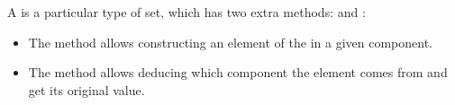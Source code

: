 
A \SetDisjointUnion is a particular type of set, which has two extra methods:  and :
\begin{itemize}
    \item The method  allows constructing an element of the  in a given component.
    \item The method  allows deducing which component the element comes from and get its original value.
\end{itemize}

\begin{widepar}
\end{widepar}


\begin{widepar}
\end{widepar}
